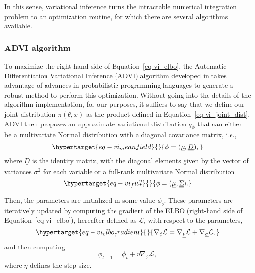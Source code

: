 \documentclass[
]{scrartcl}
\begin{document}
\begin{refsegment}
In this sense, variational inference turns the intractable numerical
integration problem to an optimization routine, for which there are
several algorithms available.

\hypertarget{advi-algorithm}{%
\subsubsection{ADVI algorithm}\label{advi-algorithm}}

To maximize the right-hand side of Equation~\ref{eq-vi_elbo}, the
Automatic Differentiation Variational Inference (ADVI) algorithm
developed in \autocite{kucukelbir2016} takes advantage of advances in
probabilistic programming languages to generate a robust method to
perform this optimization. Without going into the details of the
algorithm implementation, for our purposes, it suffices to say that we
define our joint distribution \(\pi(\underline{\theta}, \underline{x})\)
as the product defined in Equation~\ref{eq-vi_joint_dist}. ADVI then
proposes an approximate variational distribution \(q_\phi\) that can
either be a multivariate Normal distribution with a diagonal covariance
matrix, i.e., \begin{equation}\protect\hypertarget{eq-vi_meanfield}{}{
\phi = (\underline{\mu}, \underline{\underline{D}}),
}\label{eq-vi_meanfield}\end{equation} where
\(\underline{\underline{D}}\) is the identity matrix, with the diagonal
elements given by the vector of variances \(\underline{\sigma}^2\) for
each variable or a full-rank multivariate Normal distribution
\begin{equation}\protect\hypertarget{eq-vi_full}{}{
\phi = (\underline{\mu}, \underline{\underline{\Sigma}}).
}\label{eq-vi_full}\end{equation}

Then, the parameters are initialized in some value \(\phi_o\). These
parameters are iteratively updated by computing the gradient of the ELBO
(right-hand side of Equation~\ref{eq-vi_elbo}), hereafter defined as
\(\mathcal{L}\), with respect to the parameters,
\begin{equation}\protect\hypertarget{eq-vi_elbo_gradient}{}{
\nabla_\phi \mathcal{L} = \nabla_{\underline{\mu}} \mathcal{L} + 
\nabla_{\underline{\sigma}}\mathcal{L},
}\label{eq-vi_elbo_gradient}\end{equation} and then computing \[
\phi_{t+1} = \phi_{t} + \eta \nabla_\phi \mathcal{L},
\] where \(\eta\) defines the step size.


\end{refsegment}
\end{document}
